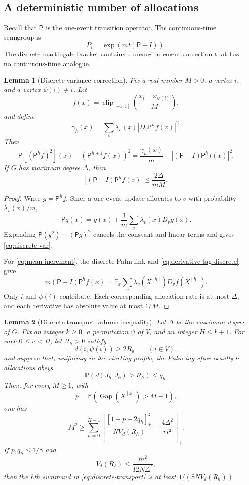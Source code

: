 \documentclass[11pt]{article}
\newtheorem{lemma}[lemma]{Lemma}
\theoremstyle{remark}
\newcommand{\E}{\mathbb{E}}
\newcommand{\Pp}{\mathbb{P}}
\newcommand{\Gap}{\operatorname{Gap}}
\newcommand{\clip}{\operatorname{clip}}
\begin{document}
\subsection{A deterministic number of allocations}

Recall that $\mathsf P$ is the one-event transition operator. The continuous-time semigroup is
\[
 P_t=\exp(mt(\mathsf P-I)).
\]
The discrete martingale bracket contains a mean-increment correction that has no continuous-time analogue.

\begin{lemma}[Discrete variance correction]\label{lem:discrete-correction}
Fix a real number $M>0$, a vertex $i$, and a vertex $\psi(i)\ne i$. Let
\[
 f(x)=\clip_{[-1,1]}\!\left(\frac{x_i-x_{\psi(i)}}{M}\right),
\]
and define
\[
 \gamma_h(x)=\sum_v\lambda_v(x)|D_v\mathsf P^hf(x)|^2.
\]
Then
\[
 \mathsf P[(\mathsf P^hf)^2](x)-(\mathsf P^{h+1}f(x))^2
 =\frac{\gamma_h(x)}m-
 |(\mathsf P-I)\mathsf P^hf(x)|^2.
 \tag{6.3}\label{eq:discrete-var}
\]
If $G$ has maximum degree $\Delta$, then
\[
 |(\mathsf P-I)\mathsf P^hf(x)|
 \le\frac{2\Delta}{mM}.
 \tag{6.4}\label{eq:mean-increment}
\]
\end{lemma}

\begin{proof}
Write $g=\mathsf P^hf$. Since a one-event update allocates to $v$ with probability $\lambda_v(x)/m$,
\[
 \mathsf Pg(x)=g(x)+\frac1m\sum_v\lambda_v(x)D_vg(x).
\]
Expanding $\mathsf P(g^2)- (\mathsf Pg)^2$ cancels the constant and linear terms and gives \eqref{eq:discrete-var}.

For \eqref{eq:mean-increment}, the discrete Palm link and \eqref{eq:derivative-tag-discrete} give
\[
 m(\mathsf P-I)\mathsf P^hf(x)
 =\E_x\sum_v\lambda_v(X^{[h]})D_vf(X^{[h]}).
\]
Only $i$ and $\psi(i)$ contribute. Each corresponding allocation rate is at most $\Delta$, and each derivative has absolute value at most $1/M$.
\end{proof}

\begin{lemma}[Discrete transport-volume inequality]\label{lem:discrete-transport}
Let $\Delta$ be the maximum degree of $G$. Fix an integer $k\ge0$, a permutation $\psi$ of $V$, and an integer $H\le k+1$. For each $0\le h<H$, let $R_h>0$ satisfy
\[
 d(i,\psi(i))\ge2R_h
 \qquad(i\in V),
\]
and suppose that, uniformly in the starting profile, the Palm tag after exactly $h$ allocations obeys
\[
 \Pp(d(J_h,J_0)\ge R_h)\le q_h.
\]
Then, for every $M\ge1$, with
\[
 p=\Pp(\Gap(X^{[k]})>M-1),
\]
one has
\[
 M^2\ge\sum_{h=0}^{H-1}
 \left[
 \frac{[1-p-2q_h]_+^2}{N V_d(R_h)}-
 \frac{4\Delta^2}{m^2}
 \right]_+.
 \tag{6.5}\label{eq:discrete-transport}
\]
If $p,q_h\le1/8$ and
\[
 V_d(R_h)\le\frac{m^2}{32N\Delta^2},
 \tag{6.6}\label{eq:absorb-discrete}
\]
then the $h$th summand in \eqref{eq:discrete-transport} is at least $1/(8N V_d(R_h))$.
\end{lemma}
\end{document}
